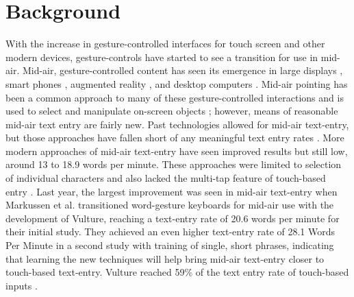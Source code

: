 \section{Background}
With the increase in gesture-controlled interfaces for touch screen and other modern devices, gesture-controls have started to see a transition for use in mid-air. Mid-air, gesture-controlled content has seen its emergence in large displays \cite{ref_pan_zoom_large_dispalys,ref_large_screen_pointing_gestures}, smart phones \cite{ref_multiscale_navigation}, augmented reality \cite{ref_augmented_reality}, and desktop computers \cite{ref_leap_painting,ref_darren_thesis,ref_alvin_thesis,ref_leap_pointing_device}. Mid-air pointing has been a common approach to many of these gesture-controlled interactions and is used to select and manipulate on-screen objects \cite{ref_large_display_pointing,ref_air_pointing,ref_ray_pointing_large_displays,ref_shadow_reaching,ref_freehand_pointing_large_displays,ref_large_screen_pointing_gestures}; however, means of reasonable mid-air text entry are fairly new. Past technologies allowed for mid-air text-entry, but those approaches have fallen short of any meaningful text entry rates \cite{ref_visual_touchpad}. More modern approaches of mid-air text-entry have seen improved results but still low, around 13 \cite{ref_selection_based_mid_air} to 18.9 \cite{ref_mid_air_text_large_displays} words per minute. These approaches were limited to selection of individual characters and also lacked the multi-tap feature of touch-based entry \cite{ref_selection_based_mid_air,ref_airstroke,ref_mid_air_text_large_displays}. Last year, the largest improvement was seen in mid-air text-entry when Markussen et al. \cite{ref_vulture} transitioned word-gesture keyboards for mid-air use with the development of Vulture, reaching a text-entry rate of 20.6 words per minute for their initial study. They achieved an even higher text-entry rate of 28.1 Words Per Minute in a second study with training of single, short phrases, indicating that learning the new techniques will help bring mid-air text-entry closer to touch-based text-entry. Vulture reached 59\% of the text entry rate of touch-based inputs \cite{ref_vulture}.

